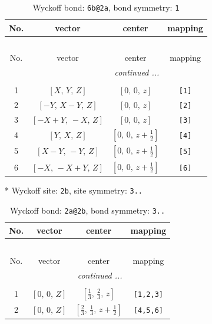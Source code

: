 \documentclass[fleqn,8pt]{jsarticle}
\begin{document}
\begin{longtable}{cccc}
\caption{Wyckoff bond: {\tt 6b@2a}, bond symmetry: {\tt 1}}
 \\
 \hline \hline
No. & vector & center & mapping \\ \hline \endfirsthead

\multicolumn{3}{l}{\tablename\ \thetable{}} \\
 \hline \hline
No. & vector & center & mapping \\ \hline \endhead

 \hline \hline
\multicolumn{3}{r}{\footnotesize\it continued ...} \\ \endfoot

 \hline \hline
\multicolumn{3}{r}{} \\ \endlastfoot

1 & $\left[ X,\, Y,\, Z \right]$ & $\left[ 0,\, 0,\, z \right]$ & {\tt [1]} \\ \hline
2 & $\left[ - Y,\, X - Y,\, Z \right]$ & $\left[ 0,\, 0,\, z \right]$ & {\tt [2]} \\ \hline
3 & $\left[ - X + Y,\, - X,\, Z \right]$ & $\left[ 0,\, 0,\, z \right]$ & {\tt [3]} \\ \hline
4 & $\left[ Y,\, X,\, Z \right]$ & $\left[ 0,\, 0,\, z + \frac{1}{2} \right]$ & {\tt [4]} \\ \hline
5 & $\left[ X - Y,\, - Y,\, Z \right]$ & $\left[ 0,\, 0,\, z + \frac{1}{2} \right]$ & {\tt [5]} \\ \hline
6 & $\left[ - X,\, - X + Y,\, Z \right]$ & $\left[ 0,\, 0,\, z + \frac{1}{2} \right]$ & {\tt [6]} \\
\end{longtable}
* Wyckoff site: {\tt 2b}, site symmetry: {\tt 3..}
\renewcommand{\arraystretch}{1.2}
\begin{longtable}{cccc}
\caption{Wyckoff bond: {\tt 2a@2b}, bond symmetry: {\tt 3..}}
 \\
 \hline \hline
No. & vector & center & mapping \\ \hline \endfirsthead

\multicolumn{3}{l}{\tablename\ \thetable{}} \\
 \hline \hline
No. & vector & center & mapping \\ \hline \endhead

 \hline \hline
\multicolumn{3}{r}{\footnotesize\it continued ...} \\ \endfoot

 \hline \hline
\multicolumn{3}{r}{} \\ \endlastfoot

1 & $\left[ 0,\, 0,\, Z \right]$ & $\left[ \frac{1}{3},\, \frac{2}{3},\, z \right]$ & {\tt [1,2,3]} \\ \hline
2 & $\left[ 0,\, 0,\, Z \right]$ & $\left[ \frac{2}{3},\, \frac{1}{3},\, z + \frac{1}{2} \right]$ & {\tt [4,5,6]} \\
\end{longtable}
\end{document}
